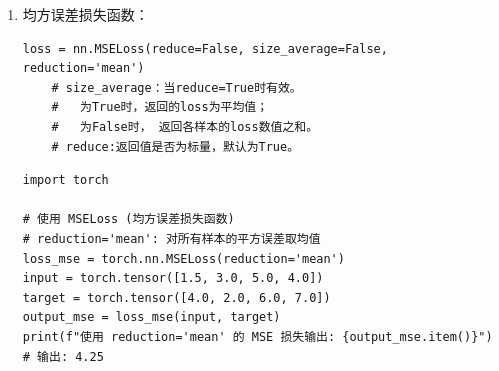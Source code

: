 \begin{enumerate}[label=\arabic*)]
\begin{lstlisting}[style=demostyle,numbers=none]
###################################################
使用 size_average=True, reduce=True 的输出: 2.0
使用 size_average=False, reduce=True 的输出: 8.0
使用 size_average=False, reduce=False 的输出: tensor([3., 3., 0., 2.])    
\end{lstlisting}
\begin{example}
    \exProblem
    给定输入$input = [1.0, 2.0, 6.0, 5.0]$, 目标$target = [4.0, 5.0, 6.0, 7.0]$，计算L1范数损失函数。
    \exSolution
    L1损失函数('torch.nn.L1Loss’)的定义是目标值和预测值之间的绝对差值。数学公式如下：
    $$\mathrm{L1Loss}=\frac1N\sum_{i=1}^N|y_i-\hat{y}_i|$$
    其中：
    $y_i$是目标值。 $\hat{y}_i$是预测值。$N$是样本的数量。

    $|1.0 - 4.0|=3.0, |2.0 - 5.0|=3.0, |6.0 - 6.0|=0.0, |5.0 - 7.0|=2.0$，所以损失值为$[3.0, 3.0, 0.0, 2.0]$。

    \begin{enumerate}[label=\arabic*)]
        \item 当  时：
        对损失进行平均，输出值为$output=\frac{3.0+3.0+0.0+2.0}{4}=2.0$。
        \item 当  时：
        对损失进行求和，输出值为$output=3.0+3.0+0.0+2.0=8.0$。
        \item 当  时：
        不进行任何聚合操作，输出的张量为每个样本的绝对误差：。
    \end{enumerate}
\end{example}


    \item 均方误差损失函数：
    \begin{lstlisting}[style=demostyle,numbers=none] 
    loss = nn.MSELoss(reduce=False, size_average=False, reduction='mean')
    # size_average：当reduce=True时有效。
    #   为True时，返回的loss为平均值；
    #   为False时， 返回各样本的loss数值之和。
    # reduce:返回值是否为标量，默认为True。
    \end{lstlisting}
\begin{lstlisting}[style=pythonstyle]
import torch

# 使用 MSELoss (均方误差损失函数)
# reduction='mean': 对所有样本的平方误差取均值
loss_mse = torch.nn.MSELoss(reduction='mean')
input = torch.tensor([1.5, 3.0, 5.0, 4.0])
target = torch.tensor([4.0, 2.0, 6.0, 7.0])
output_mse = loss_mse(input, target)
print(f"使用 reduction='mean' 的 MSE 损失输出: {output_mse.item()}")  # 输出: 4.25


\end{lstlisting}
\end{enumerate}
